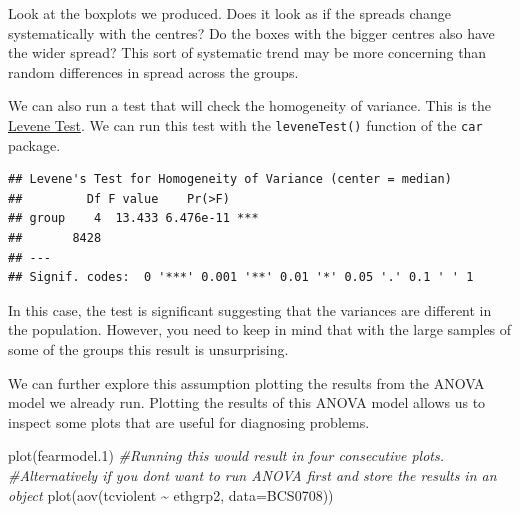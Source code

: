 \documentclass[
]{book}
\newenvironment{Shaded}{\begin{snugshade}}{\end{snugshade}}
\newcommand{\AttributeTok}[1]{\textcolor[rgb]{0.77,0.63,0.00}{#1}}
\newcommand{\CommentTok}[1]{\textcolor[rgb]{0.56,0.35,0.01}{\textit{#1}}}
\newcommand{\FloatTok}[1]{\textcolor[rgb]{0.00,0.00,0.81}{#1}}
\newcommand{\FunctionTok}[1]{\textcolor[rgb]{0.00,0.00,0.00}{#1}}
\newcommand{\NormalTok}[1]{#1}
\newcommand{\SpecialCharTok}[1]{\textcolor[rgb]{0.00,0.00,0.00}{#1}}
\begin{document}
Look at the boxplots we produced. Does it look as if the spreads change systematically with the centres? Do the boxes with the bigger centres also have the wider spread? This sort of systematic trend may be more concerning than random differences in spread across the groups.

We can also run a test that will check the homogeneity of variance. This is the \href{http://en.wikipedia.org/wiki/Levene's_test}{Levene Test}. We can run this test with the \texttt{leveneTest()} function of the \texttt{car} package.

\begin{Shaded}
\end{Shaded}

\begin{verbatim}
## Levene's Test for Homogeneity of Variance (center = median)
##         Df F value    Pr(>F)    
## group    4  13.433 6.476e-11 ***
##       8428                      
## ---
## Signif. codes:  0 '***' 0.001 '**' 0.01 '*' 0.05 '.' 0.1 ' ' 1
\end{verbatim}

In this case, the test is significant suggesting that the variances are different in the population. However, you need to keep in mind that with the large samples of some of the groups this result is unsurprising.

We can further explore this assumption plotting the results from the ANOVA model we already run. Plotting the results of this ANOVA model allows us to inspect some plots that are useful for diagnosing problems.

\begin{Shaded}
\begin{Highlighting}[]
\FunctionTok{plot}\NormalTok{(fearmodel}\FloatTok{.1}\NormalTok{) }\CommentTok{\#Running this would result in four consecutive plots.}
\CommentTok{\#Alternatively if you don\textquotesingle{}t want to run ANOVA first and store the results in an object}
\FunctionTok{plot}\NormalTok{(}\FunctionTok{aov}\NormalTok{(tcviolent }\SpecialCharTok{\textasciitilde{}}\NormalTok{ ethgrp2, }\AttributeTok{data=}\NormalTok{BCS0708))}
\end{Highlighting}
\end{Shaded}
\end{document}
